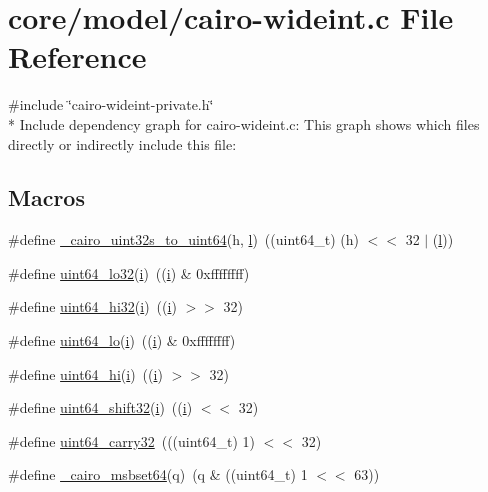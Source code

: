 \hypertarget{cairo-wideint_8c}{}\section{core/model/cairo-\/wideint.c File Reference}
\label{cairo-wideint_8c}
{\ttfamily \#include \char`\"{}cairo-\/wideint-\/private.\+h\char`\"{}}\\*
Include dependency graph for cairo-\/wideint.c\+:
This graph shows which files directly or indirectly include this file\+:
\subsection*{Macros}
\begin{DoxyCompactItemize}
\item 
\#define \hyperlink{cairo-wideint_8c_a6ceaa8499ff57c64a3662d1a3f4c2a1f}{\+\_\+cairo\+\_\+uint32s\+\_\+to\+\_\+uint64}(h,  \hyperlink{lte__pathloss_8m_a5b54c0a045f179bcbbbc9abcb8b5cd4c}{l})~((uint64\+\_\+t) (h) $<$$<$ 32 $\vert$ (\hyperlink{lte__pathloss_8m_a5b54c0a045f179bcbbbc9abcb8b5cd4c}{l}))
\item 
\#define \hyperlink{cairo-wideint_8c_a8dc7acd6338a65a4f3961e4a181fce82}{uint64\+\_\+lo32}(\hyperlink{lte__uplink__power__control_8m_a6f6ccfcf58b31cb6412107d9d5281426}{i})~((\hyperlink{lte__uplink__power__control_8m_a6f6ccfcf58b31cb6412107d9d5281426}{i}) \& 0xffffffff)
\item 
\#define \hyperlink{cairo-wideint_8c_a8140801e22e4b973bf94d6e94680f96e}{uint64\+\_\+hi32}(\hyperlink{lte__uplink__power__control_8m_a6f6ccfcf58b31cb6412107d9d5281426}{i})~((\hyperlink{lte__uplink__power__control_8m_a6f6ccfcf58b31cb6412107d9d5281426}{i}) $>$$>$ 32)
\item 
\#define \hyperlink{cairo-wideint_8c_a29ad5094a995c059a55c6aa5cdcda43d}{uint64\+\_\+lo}(\hyperlink{lte__uplink__power__control_8m_a6f6ccfcf58b31cb6412107d9d5281426}{i})~((\hyperlink{lte__uplink__power__control_8m_a6f6ccfcf58b31cb6412107d9d5281426}{i}) \& 0xffffffff)
\item 
\#define \hyperlink{cairo-wideint_8c_a2c3c9115e2f016d9db0de283f89bf73c}{uint64\+\_\+hi}(\hyperlink{lte__uplink__power__control_8m_a6f6ccfcf58b31cb6412107d9d5281426}{i})~((\hyperlink{lte__uplink__power__control_8m_a6f6ccfcf58b31cb6412107d9d5281426}{i}) $>$$>$ 32)
\item 
\#define \hyperlink{cairo-wideint_8c_a037c0354557363af5e07221877971065}{uint64\+\_\+shift32}(\hyperlink{lte__uplink__power__control_8m_a6f6ccfcf58b31cb6412107d9d5281426}{i})~((\hyperlink{lte__uplink__power__control_8m_a6f6ccfcf58b31cb6412107d9d5281426}{i}) $<$$<$ 32)
\item 
\#define \hyperlink{cairo-wideint_8c_a3e812d99f15de10d401ecc9f885e0d26}{uint64\+\_\+carry32}~(((uint64\+\_\+t) 1) $<$$<$ 32)
\item 
\#define \hyperlink{cairo-wideint_8c_a53f1e9646f6581881ca79a896f8dc37b}{\+\_\+cairo\+\_\+msbset64}(q)~(q \& ((uint64\+\_\+t) 1 $<$$<$ 63))
\end{DoxyCompactItemize}
